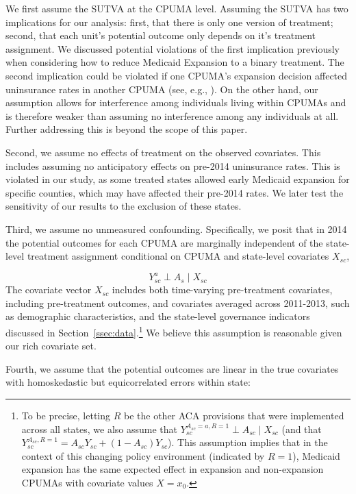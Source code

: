 \documentclass[aoas]{imsart}
\theoremstyle{plain}
\theoremstyle{remark}
\begin{document}
We first assume the SUTVA at the CPUMA level. Assuming the SUTVA has two implications for our analysis: first, that there is only one version of treatment; second, that each unit's potential outcome only depends on it's treatment assignment. We discussed potential violations of the first implication previously when considering how to reduce Medicaid Expansion to a binary treatment. The second implication could be violated if one CPUMA's expansion decision affected uninsurance rates in another CPUMA (see, e.g., \cite{frean2017premium}). On the other hand, our assumption allows for interference among individuals living within CPUMAs and is therefore weaker than assuming no interference among any individuals at all. Further addressing this is beyond the scope of this paper.

Second, we assume no effects of treatment on the observed covariates. This includes assuming no anticipatory effects on pre-2014 uninsurance rates. This is violated in our study, as some treated states allowed early Medicaid expansion for specific counties, which may have affected their pre-2014 rates. We later test the sensitivity of our results to the exclusion of these states.

Third, we assume no unmeasured confounding. Specifically, we posit that in 2014 the potential outcomes for each CPUMA are marginally independent of the state-level treatment assignment conditional on CPUMA and state-level covariates $X_{sc}$, 

\begin{equation}\label{eqn:unconfoundedness}
Y_{sc}^a \perp A_s \mid X_{sc}
\end{equation}
The covariate vector $X_{sc}$ includes both time-varying pre-treatment covariates, including pre-treatment outcomes, and covariates averaged across 2011-2013, such as demographic characteristics, and the state-level governance indicators discussed in Section~\ref{ssec:data}.\footnote{To be precise, letting $R$ be the other ACA provisions that were implemented across all states, we also assume that $Y^{A_{sc} = a, R = 1}_{sc} \perp A_{sc} \mid X_{sc}$ (and that $Y_{sc}^{A_{sc}, R = 1} = A_{sc}Y_{sc} + (1 - A_{sc})Y_{sc}$). This assumption implies that in the context of this changing policy environment (indicated by $R = 1$), Medicaid expansion has the same expected effect in expansion and non-expansion CPUMAs with covariate values $X = x_0$.} We believe this assumption is reasonable given our rich covariate set. 

Fourth, we assume that the potential outcomes are linear in the true covariates with homoskedastic but equicorrelated errors within state:
\end{document}
